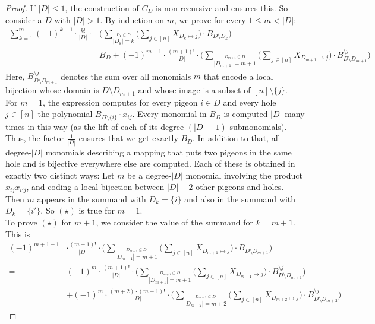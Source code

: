 \documentclass[10pt,a4paper]{article}
\begin{document}
\begin{proof}
	If $|D| \leq 1$, the construction of $C_D$ is non-recursive and ensures this. So consider a $D$ with $|D| > 1$. By induction on $m$, we prove for every $1 \leq m < |D|$:
	\begin{align*}
		\sum_{k=1}^{m} (-1)^{k-1} \cdot \frac{k!}{|D|} \cdot &\Big(\sum_{\stackrel{D_k \subseteq D}{|D_k| = k}} \Big(\sum_{j \in [n]} X_{D_k \mapsto j}\Big) \cdot B_{D \setminus D_k} \Big)\\
		=& B_D + (-1)^{m-1} \cdot \frac{(m+1)!}{|D|} \cdot \Big(\sum_{\stackrel{D_{m+1} \subseteq D}{|D_{m+1}| = m+1}} \Big(\sum_{j \in [n]} X_{D_{m+1} \mapsto j}\Big) \cdot B^{\setminus j}_{D \setminus D_{m+1}} \Big) \tag{$\star$}
	\end{align*}	
	Here, $B^{\setminus j}_{D \setminus D_{m+1}}$ denotes the sum over all monomials $m$ that encode a local bijection whose domain is $D \setminus D_{m+1}$ and whose image is a subset of $[n] \setminus \{j\}$.\\
	For $m = 1$, the expression computes for every pigeon $i \in D$ and every hole $j \in [n]$ the polynomial $B_{D \setminus \{i\}} \cdot x_{ij}$. Every monomial in $B_D$ is computed $|D|$ many times in this way (as the lift of each of its degree-$(|D|-1)$ submonomials). Thus, the factor $\frac{1}{|D|}$ ensures that we get exactly $B_D$. In addition to that, all degree-$|D|$ monomials describing a mapping that puts two pigeons in the same hole and is bijective everywhere else are computed. Each of these is obtained in exactly two distinct ways: Let $m$ be a degree-$|D|$ monomial involving the product $x_{ij}x_{i'j}$, and coding a local bijection between $|D|-2$ other pigeons and holes. Then $m$ appears in the summand with $D_k = \{i\}$ and also in the summand with $D_k = \{i'\}$. So $(\star)$ is true for $m = 1$.\\
	To prove $(\star)$ for $m+1$, we consider the value of the summand for $k = m+1$. This is
	\begin{align*}
		(-1)^{m+1-1} &\cdot \frac{(m+1)!}{|D|} \cdot \Big(\sum_{\stackrel{D_{m+1} \subseteq D}{|D_{m+1}| = m+1}} \Big(\sum_{j \in [n]} X_{D_{m+1} \mapsto j}\Big) \cdot B_{D \setminus D_{m+1}} \Big)\\
		=& 	(-1)^{m} \cdot \frac{(m+1)!}{|D|} \cdot \Big(\sum_{\stackrel{D_{m+1} \subseteq D}{|D_{m+1}| = m+1}} \Big(\sum_{j \in [n]} X_{D_{m+1} \mapsto j}\Big) \cdot B^{\setminus j}_{D \setminus D_{m+1}} \Big)\\
		&+ (-1)^{m} \cdot \frac{(m+2) \cdot (m+1)!}{|D|} \cdot \Big(\sum_{\stackrel{D_{m+2} \subseteq D}{|D_{m+2}| = m+2}} \Big(\sum_{j \in [n]} X_{D_{m+2} \mapsto j}\Big) \cdot B^{\setminus j}_{D \setminus D_{m+2}} \Big)

\end{align*}
\end{proof}
\end{document}
